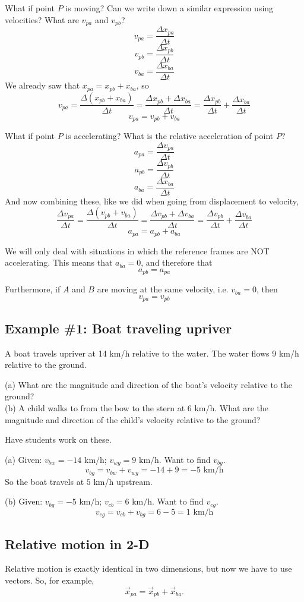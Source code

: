 What if point $P$ is moving? Can we write down a similar expression using velocities? What are $v_{pa}$ and $v_{pb}$?
$$v_{pa}=\frac{\Delta{x_{pa}}}{\Delta{t}}$$
$$v_{pb}=\frac{\Delta{x_{pb}}}{\Delta{t}}$$
$$v_{ba}=\frac{\Delta{x_{ba}}}{\Delta{t}}$$
We already saw that $x_{pa}=x_{pb}+x_{ba}$, so
$$v_{pa}=\frac{\Delta(x_{pb}+x_{ba})}{\Delta{t}}=\frac{\Delta x_{pb} + \Delta x_{ba}}{\Delta t} = \frac{\Delta{x_{pb}}}{\Delta{t}}+\frac{\Delta{x_{ba}}}{\Delta{t}}$$
$$\boxed{v_{pa}=v_{pb}+v_{ba}}$$

What if point $P$ is accelerating? What is the relative acceleration of point $P$?
$$a_{pa}=\frac{\Delta{v_{pa}}}{\Delta{t}}$$
$$a_{pb}=\frac{\Delta{v_{pb}}}{\Delta{t}}$$
$$a_{ba}=\frac{\Delta{x_{ba}}}{\Delta{t}}$$
And now combining these, like we did when going from displacement to velocity,
$$\frac{\Delta{v_{pa}}}{\Delta{t}}=\frac{\Delta(v_{pb}+v_{ba})}{\Delta t} = \frac{\Delta{v_{pb}}+\Delta{v_{ba}}}{\Delta{t}}=\frac{\Delta{v_{pb}}}{\Delta{t}}+\frac{\Delta{v_{ba}}}{\Delta{t}}$$
$$a_{pa}=a_{pb}+a_{ba}$$

We will only deal with situations in which the reference frames are NOT accelerating. This means that $a_{ba}=0$, and therefore that 
$$\boxed{a_{pb}=a_{pa}}$$

Furthermore, if $A$ and $B$ are moving at the same velocity, i.e. $v_{ba}=0$, then
$$\boxed{v_{pa}=v_{pb}}$$

\subsection{Example \#1: Boat traveling upriver}
A boat travels upriver at 14 km/h relative to the water. The water flows 9 km/h relative to the ground.

(a) What are the magnitude and direction of the boat's velocity relative to the ground?\\
(b) A child walks to from the bow to the stern at 6 km/h. What are the magnitude and direction of the child's velocity relative to the ground?

Have students work on these.

(a) Given: $v_{bw}=-14\mbox{ km/h}$; $v_{wg}=9\mbox{ km/h}$. Want to find $v_{bg}$.
$$v_{bg}=v_{bw}+v_{wg}=-14+9=-5\mbox{ km/h}$$
So the boat travels at $5$ km/h upstream.

(b) Given: $v_{bg}=-5\mbox{ km/h}$; $v_{cb}=6\mbox{ km/h}$. Want to find $v_{cg}$.
$$v_{cg}=v_{cb}+v_{bg}=6-5=1\mbox{ km/h}$$

\subsection{Relative motion in 2-D}
Relative motion is exactly identical in two dimensions, but now we have to use vectors. So, for example,
$$\vec{x}_{pa}=\vec{x}_{pb}+\vec{x}_{ba}.$$


